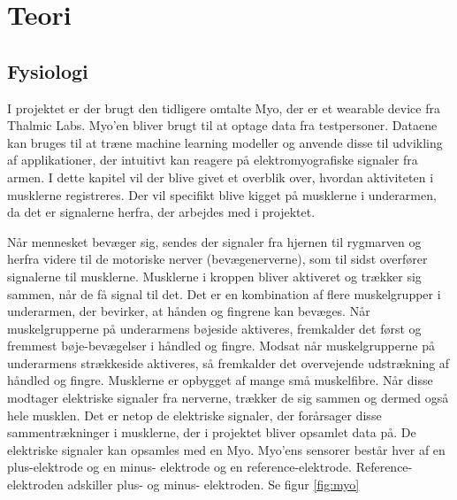 \thispagestyle{fancy}
\chapter{Teori}
\label{chp:teori}

\section{Fysiologi}
\label{sec:fysiologi}
I projektet er der brugt den tidligere omtalte Myo, der er et wearable device fra Thalmic Labs. Myo'en bliver brugt til at optage data fra testpersoner. Dataene kan bruges til at træne machine learning modeller og anvende disse til udvikling af applikationer, der intuitivt kan reagere på elektromyografiske signaler fra armen.
I dette kapitel vil der blive givet et overblik over, hvordan aktiviteten i musklerne registreres. Der vil specifikt blive kigget på musklerne i underarmen, da det er signalerne herfra, der arbejdes med i projektet.



Når mennesket bevæger sig, sendes der signaler fra hjernen til rygmarven og herfra videre til de motoriske nerver (bevægenerverne), som til sidst overfører signalerne til musklerne. Musklerne i kroppen bliver aktiveret og trækker sig sammen, når de få signal til det. Det er en kombination af flere muskelgrupper i underarmen, der bevirker, at hånden og fingrene kan bevæges. Når muskelgrupperne på underarmens bøjeside aktiveres, fremkalder det først og fremmest bøje-bevægelser i håndled og fingre. Modsat når muskelgrupperne på underarmens strækkeside aktiveres, så fremkalder det overvejende udstrækning af håndled og fingre. Musklerne er opbygget af mange små muskelfibre. Når disse modtager elektriske signaler fra nerverne, trækker de sig sammen og dermed også hele musklen. Det er netop de elektriske signaler, der forårsager disse sammentrækninger i musklerne, der i projektet bliver opsamlet data på. De elektriske signaler kan opsamles med en Myo. Myo'ens sensorer består hver af en plus-elektrode og en minus- elektrode og en reference-elektrode. Reference-elektroden adskiller plus- og minus- elektroden. Se figur \ref{fig:myo}

